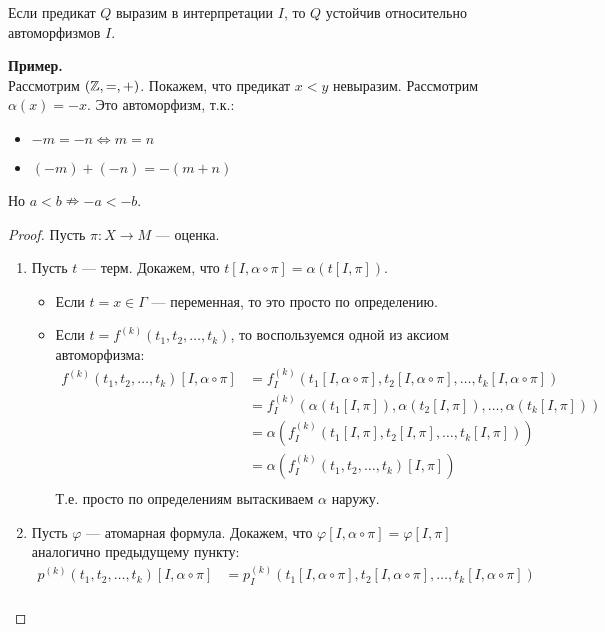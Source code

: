 \begin{theorem}
    Если предикат $Q$ выразим в интерпретации $I$, то $Q$ устойчив относительно автоморфизмов $I$.
\end{theorem}
\textbf{Пример.} \\
Рассмотрим $(\mathbb{Z}, =, +)$. Покажем, что предикат $x < y$ невыразим.
Рассмотрим $\alpha(x) = -x$. Это автоморфизм, т.к.:
\begin{itemize}
    \item $-m = -n \Leftrightarrow m = n$
    \item $(-m) + (-n) = -(m + n)$
\end{itemize}
Но $a < b \nRightarrow {-a < -b}$.
\begin{proof}
    Пусть $\pi : X \to M$ --- оценка.
    \begin{enumerate}
        \item Пусть $t$ --- терм. Докажем, что $t[I, \alpha \circ \pi] = \alpha(t[I, \pi])$.
        \begin{itemize}
            \item Если $t = x \in \Gamma$ --- переменная, то это просто по определению.
            \item Если $t = f^{(k)}(t_1, t_2, \dots, t_k)$, то воспользуемся одной из аксиом автоморфизма:
            \begin{align*}
                f^{(k)}(t_1, t_2, \dots, t_k)[I, \alpha \circ \pi] &= 
                f^{(k)}_I(t_1[I, \alpha \circ \pi], t_2[I, \alpha \circ \pi], \dots, t_k[I, \alpha \circ \pi]) \\
                &= f^{(k)}_I(\alpha(t_1[I, \pi]), \alpha(t_2[I, \pi]), \dots, \alpha(t_k[I, \pi])) \\
                &= \alpha(f^{(k)}_I(t_1[I, \pi], t_2[I, \pi], \dots, t_k[I, \pi])) \\
                &= \alpha(f^{(k)}_I(t_1, t_2, \dots, t_k)[I, \pi]) \\
            \end{align*}
            Т.е. просто по определениям вытаскиваем $\alpha$ наружу.
        \end{itemize}
        \item Пусть $\varphi$ --- атомарная формула. Докажем, что $\varphi[I, \alpha \circ \pi] = \varphi[I, \pi]$ аналогично предыдущему пункту:
        \begin{align*}
            p^{(k)}(t_1, t_2, \dots, t_k)[I, \alpha \circ \pi] &= 
            p^{(k)}_I(t_1[I, \alpha \circ \pi], t_2[I, \alpha \circ \pi], \dots, t_k[I, \alpha \circ \pi]) \\

\end{align*}
\end{enumerate}
\end{proof}
